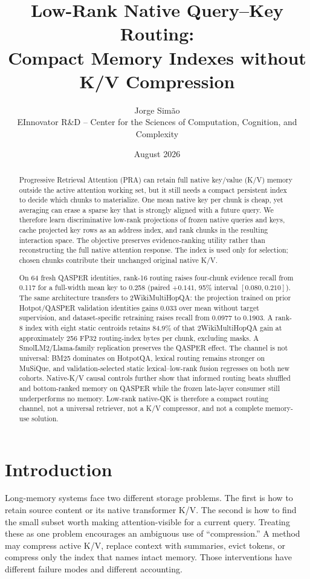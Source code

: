 \documentclass[11pt]{article}
\title{Low-Rank Native Query--Key Routing:\\Compact Memory Indexes without K/V Compression}
\author{Jorge Sim\~ao\\EInnovator R\&D -- Center for the Sciences of Computation, Cognition, and Complexity}
\date{August 2026}
\newcommand{\pra}{\textsc{PRA}\xspace}
\newcommand{\qk}{\textsc{QK}\xspace}
\newcommand{\kv}{\textsc{K/V}\xspace}
\newcommand{\hotpot}{HotpotQA\xspace}
\newcommand{\qasper}{QASPER\xspace}
\newcommand{\twowiki}{2WikiMultiHopQA\xspace}
\newcommand{\musique}{MuSiQue\xspace}
\begin{document}
\maketitle

\begin{abstract}
Progressive Retrieval Attention (\pra) can retain full native key/value (\kv)
memory outside the active attention working set, but it still needs a compact
persistent index to decide which chunks to materialize. One mean native key per
chunk is cheap, yet averaging can erase a sparse key that is strongly aligned
with a future query. We therefore learn discriminative low-rank projections of
frozen native queries and keys, cache projected key rows as an address index,
and rank chunks in the resulting interaction space. The objective preserves
evidence-ranking utility rather than reconstructing the full native attention
response. The index is used only for selection; chosen chunks contribute their
unchanged original native \kv.

On 64 fresh \qasper identities, rank-16 routing raises four-chunk evidence
recall from 0.117 for a full-width mean key to 0.258 (paired $+0.141$, 95\%
interval $[0.080,0.210]$). The same architecture transfers to \twowiki: the
projection trained on prior Hotpot/QASPER validation identities gains 0.033
over mean without target supervision, and dataset-specific retraining raises
recall from 0.0977 to 0.1903. A rank-8 index with eight static centroids
retains 84.9\% of that \twowiki gain at approximately 256 FP32 routing-index
bytes per chunk, excluding masks. A SmolLM2/Llama-family replication preserves the \qasper
effect. The channel is not universal: BM25 dominates on \hotpot, lexical
routing remains stronger on \musique, and validation-selected static
lexical--low-rank fusion regresses on both new cohorts. Native-\kv causal
controls further show that informed routing beats shuffled and bottom-ranked
memory on \qasper while the frozen late-layer consumer still underperforms no
memory. Low-rank native-\qk is therefore a compact routing channel, not a
universal retriever, not a \kv compressor, and not a complete memory-use
solution.
\end{abstract}

\section{Introduction}
Long-memory systems face two different storage problems. The first is how to
retain source content or its native transformer \kv. The second is how to find
the small subset worth making attention-visible for a current query. Treating
these as one problem encourages an ambiguous use of ``compression.'' A method
may compress active \kv, replace context with summaries, evict tokens, or
compress only the index that names intact memory. Those interventions have
different failure modes and different accounting.
\end{document}
